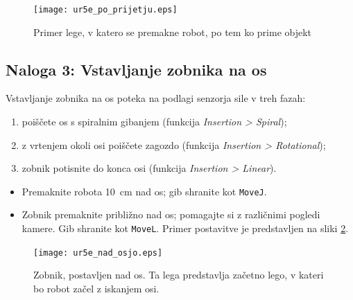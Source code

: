   \begin{figure}[!hbt]
\centering
 \texttt{[image: ur5e\_po\_prijetju.eps]}
\caption{Primer lege, v katero se premakne robot, po tem ko prime objekt}
\label{fig:ur_after}
\end{figure}


\subsection{Naloga 3: Vstavljanje zobnika na os}

Vstavljanje zobnika na os poteka na podlagi senzorja sile v treh fazah:
\begin{enumerate}
  \item poiščete os s spiralnim gibanjem (funkcija \emph{Insertion > Spiral});
  \item z vrtenjem okoli osi poiščete zagozdo (funkcija \emph{Insertion > Rotational});
  \item zobnik potisnite do konca osi (funkcija \emph{Insertion > Linear}).
\end{enumerate}


\begin{mdframed}[backgroundcolor=yellow!20, shadow=true,roundcorner=8pt]
\begin{itemize}
  \item Premaknite robota 10~cm nad os; gib shranite kot \verb"MoveJ".
  \item Zobnik premaknite približno nad os; pomagajte si z različnimi pogledi kamere. Gib shranite kot \verb"MoveL". Primer postavitve je predstavljen na sliki \ref{fig:ur_nad_osjo}.
\end{itemize}
\end{mdframed}
  \begin{figure}[!hbt]
\centering
 \texttt{[image: ur5e\_nad\_osjo.eps]}
\caption{Zobnik, postavljen nad os. Ta lega predstavlja začetno lego, v kateri bo robot začel z iskanjem osi.}
\label{fig:ur_nad_osjo}
\end{figure}

